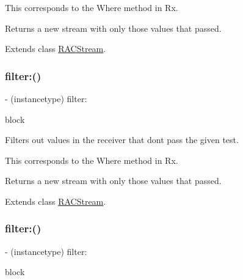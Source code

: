 This corresponds to the {\ttfamily Where} method in Rx.

Returns a new stream with only those values that passed. 

Extends class \mbox{\hyperlink{interface_r_a_c_stream_ae6a990d05708acea33f1c31102f4989b}{R\+A\+C\+Stream}}.

\mbox{\label{category_r_a_c_stream_07_operations_08_ae6a990d05708acea33f1c31102f4989b}} 
\subsubsection{\texorpdfstring{filter\+:()}{filter:()}\hspace{0.1cm}{\footnotesize\ttfamily [2/3]}}
{\footnotesize\ttfamily -\/ (instancetype) filter\+: \begin{DoxyParamCaption}\item[{(B\+O\+OL($^\wedge$)(id value))}]{block }\end{DoxyParamCaption}}

Filters out values in the receiver that don\textquotesingle{}t pass the given test.

This corresponds to the {\ttfamily Where} method in Rx.

Returns a new stream with only those values that passed. 

Extends class \mbox{\hyperlink{interface_r_a_c_stream_ae6a990d05708acea33f1c31102f4989b}{R\+A\+C\+Stream}}.

\mbox{\label{category_r_a_c_stream_07_operations_08_ae6a990d05708acea33f1c31102f4989b}} 
\subsubsection{\texorpdfstring{filter\+:()}{filter:()}\hspace{0.1cm}{\footnotesize\ttfamily [3/3]}}
{\footnotesize\ttfamily -\/ (instancetype) filter\+: \begin{DoxyParamCaption}\item[{(B\+O\+OL($^\wedge$)(id value))}]{block }\end{DoxyParamCaption}}

